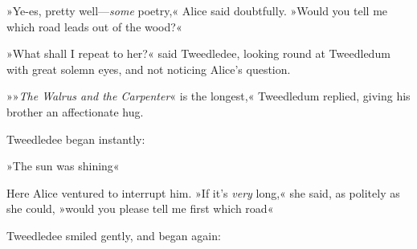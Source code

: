 »Ye-es, pretty well—\textit{some} poetry,« Alice said doubtfully. »Would you tell me which road leads out of the wood?«

»What shall I repeat to her?« said Tweedledee, looking round at Tweedledum with great solemn eyes, and not noticing Alice's question.

»»\textit{The Walrus and the Carpenter}« is the longest,« Tweedledum replied, giving his brother an affectionate hug.

Tweedledee began instantly:

»The sun was shining\longdash«

Here Alice ventured to interrupt him. »If it's \textit{very} long,« she said, as politely as she could, »would you please tell me first which road\longdash«

Tweedledee smiled gently, and began again:

